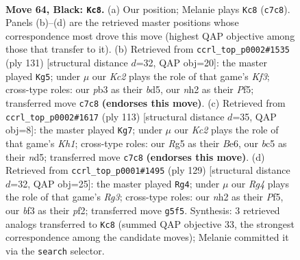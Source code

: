\documentclass[11pt]{article}
\begin{document}
\clearpage

\begin{figure}[p]\centering
\begin{subfigure}{0.46\textwidth}\centering
\resizebox{\linewidth}{!}{%
\newchessgame
\chessboard[
  setfen={8/2k5/4b3/2B3r1/PK6/1P3B1p/3R3N/8 b - - 7 64},
  showmover=false,
  pgfstyle=straightmove, color=movearrow, markmove={c7-c8}
]}
\caption{}
\end{subfigure}\hfill
\begin{subfigure}{0.46\textwidth}\centering
\resizebox{\linewidth}{!}{%
\newchessgame
\chessboard[
  setfen={8/8/5k2/3B1p2/7b/3NPK2/2r2P2/8 b - - 13 66},
  showmover=false,
  pgfstyle=straightmove, color=movearrow, markmove={f6-g5}
]}
\caption{}
\end{subfigure}
\\[4pt]
\begin{subfigure}{0.46\textwidth}\centering
\resizebox{\linewidth}{!}{%
\newchessgame
\chessboard[
  setfen={3r3k/8/4b3/3N3n/2B1P1p1/1PK5/8/R7 b - - 3 57},
  showmover=false,
  pgfstyle=straightmove, color=movearrow, markmove={h8-g7}
]}
\caption{}
\end{subfigure}\hfill
\begin{subfigure}{0.46\textwidth}\centering
\resizebox{\linewidth}{!}{%
\newchessgame
\chessboard[
  setfen={8/2k5/4p1r1/5p2/1P6/P6R/1b3PB1/5K2 b - - 4 65},
  showmover=false,
  pgfstyle=straightmove, color=movearrow, markmove={g6-g4}
]}
\caption{}
\end{subfigure}
\caption{\textbf{Move 64, Black: \texttt{Kc8}.} (a) Our position; Melanie plays \texttt{Kc8} (\texttt{c7c8}). Panels (b)--(d) are the retrieved master positions whose correspondence most drove this move (highest QAP objective among those that transfer to it). (b) Retrieved from \texttt{ccrl\_top\_p0002\#1535} (ply 131) [structural distance $d$=32, QAP obj=20]: the master played \texttt{Kg5}; under $\mu$ our \emph{Kc2} plays the role of that game's \emph{Kf3}; cross-type roles: our \emph{p}b3 as their \emph{b}d5, our \emph{n}h2 as their \emph{P}f5; transferred move \texttt{c7c8} \textbf{(endorses this move)}. (c) Retrieved from \texttt{ccrl\_top\_p0002\#1617} (ply 113) [structural distance $d$=35, QAP obj=8]: the master played \texttt{Kg7}; under $\mu$ our \emph{Kc2} plays the role of that game's \emph{Kh1}; cross-type roles: our \emph{R}g5 as their \emph{B}e6, our \emph{b}c5 as their \emph{n}d5; transferred move \texttt{c7c8} \textbf{(endorses this move)}. (d) Retrieved from \texttt{ccrl\_top\_p0001\#1495} (ply 129) [structural distance $d$=32, QAP obj=25]: the master played \texttt{Rg4}; under $\mu$ our \emph{Rg4} plays the role of that game's \emph{Rg3}; cross-type roles: our \emph{n}h2 as their \emph{P}f5, our \emph{b}f3 as their \emph{p}f2; transferred move \texttt{g5f5}. Synthesis: 3 retrieved analogs transferred to \texttt{Kc8} (summed QAP objective 33, the strongest correspondence among the candidate moves); Melanie committed it via the \texttt{search} selector.}
\label{fig:thought-m127}
\end{figure}
\end{document}
